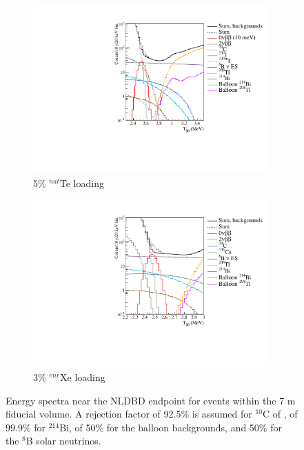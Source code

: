 \begin{figure}
\centering
\begin{subfigure}[b]{0.45\textwidth}
 \includegraphics[width=\textwidth]{dbd/spectrum_plot_te_5.pdf}
 \caption{5\% $^{nat}$Te loading}
 \label{fig:spectrum-te}
\end{subfigure}
\begin{subfigure}[b]{0.45\textwidth}
 \includegraphics[width=\textwidth]{dbd/spectrum_plot_xe.pdf}
 \caption{3\% $^{enr}$Xe loading}
 \label{fig:spectrum-xe}
\end{subfigure}
\caption{Energy spectra near the NLDBD endpoint for events within the 7 m fiducial volume. A rejection factor of 92.5\% is assumed for $^{10}$C of , of 99.9\% for $^{214}$Bi, of 50\% for the balloon backgrounds, and 50\% for the $^8$B solar neutrinos.}
\label{fig:spectrum-plots}
\end{figure}

